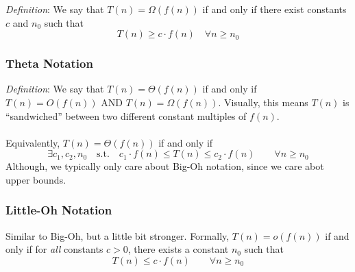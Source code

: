 \documentclass[12pt]{article}
\theoremstyle{plain}
\theoremstyle{definition}
\theoremstyle{remark}
\begin{document}
{\sl Definition}: We say that $T(n)=\Omega(f(n))$ if 
and only if there exist constants $c$ and $n_0$
such that 
    \[ T(n) \geq c\cdot f(n) \quad \forall n\geq n_0 \]

\subsubsection{Theta Notation}

{\sl Definition}: We say that $T(n) =\Theta(f(n))$ if
and only if $T(n)=O(f(n))$ AND $T(n) = \Omega(f(n))$.
Visually, this means $T(n)$ is ``sandwiched''
between two different constant multiples of $f(n)$.
\\
\\
Equivalently, $T(n) =\Theta(f(n))$ if and only if
\[ \exists c_1, c_2, n_0 \quad \text{s.t.}
    \quad c_1 \cdot f(n) \leq T(n) \leq c_2 \cdot f(n)
    \qquad \forall n\geq n_0 \]
Although, we typically only care about Big-Oh notation,
since we care abot upper bounds.

\subsubsection{Little-Oh Notation}

Similar to Big-Oh, but a little bit stronger. 
Formally, $T(n) = o(f(n))$ if and only
if for \emph{all} constants $c>0$, there exists 
a constant $n_0$ such that
    \[ T(n) \leq c\cdot f(n) \qquad \forall n \geq n_0 \]
\end{document}
